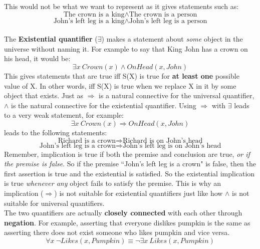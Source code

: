 \documentclass{article}
\newcommand{\n}[0]{\\[\baselineskip]}
\begin{document}
This would not be what we want to represent as it gives statements such as:
\begin{equation}
\text{The crown is a king} \wedge \text{The crown is a person}
\end{equation}
\begin{equation}
\text{John's left leg is a king} \wedge \text{John's left leg is a person}
\end{equation}
\n
The \textbf{Existential quantifier} ($\exists$) makes a statement about \textit{some} object in the universe without naming it. For example to say that King John has a crown on his head, it would be:
\begin{equation}
\exists x\ Crown(x) \wedge OnHead(x, John)
\end{equation}
This gives statements that are true iff S(X) is true for \textbf{at least one} possible value of X. In other words, iff S(X) is true when we replace X in it by some object that exists. Just as $\Rightarrow$ is a natural connective for the universal quantifier, $\wedge$ is the natural connective for the existential quantifier. Using $\Rightarrow$ with $\exists$ leads to a very weak statement, for example:
\begin{equation}
\exists x\ Crown(x) \Rightarrow OnHead(x, John)
\end{equation}
leads to the following statements:
\begin{equation}
\text{Richard is a crown} \Rightarrow \text{Richard is on John's head}
\end{equation}
\begin{equation}
\text{John's left leg is a crown} \Rightarrow \text{John's left leg is on John's head}
\end{equation}
Remember, implication is true if both the premise and conclusion are true, \textit{or if the premise is false}. So if the premise ``John's left leg is a crown" is false, then the first assertion is true and the existential is satisfied. So the existential implication is true \textit{whenever any} object fails to satisfy the premise. This is why an implication ($\Rightarrow$) is not suitable for existential quantifiers just like how $\wedge$ is not suitable for universal quantifiers. 
\n
The two quantifiers are actually \textbf{closely connected} with each other through \textbf{negation}. For example, asserting that everyone dislikes pumpkin is the same as asserting there does not exist someone who likes pumpkin and vice versa.
\begin{equation}
\forall x\ \neg Likes(x, Pumpkin) \equiv \neg \exists x\ Likes(x, Pumpkin)
\end{equation}
\end{document}
